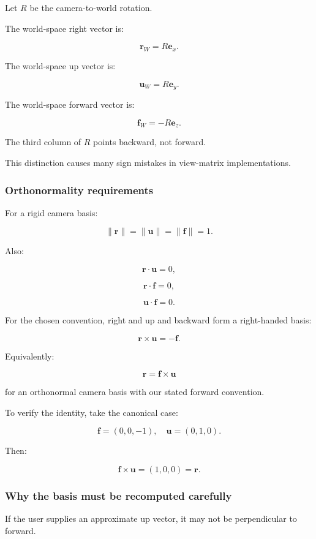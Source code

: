 Let \(R\) be the camera-to-world rotation.

The world-space right vector is:

\[
 \boxed{ \mathbf r_W=R\mathbf e_x }.
\]

The world-space up vector is:

\[
 \boxed{ \mathbf u_W=R\mathbf e_y }.
\]

The world-space forward vector is:

\[
 \boxed{ \mathbf f_W=-R\mathbf e_z }.
\]

The third column of \(R\) points backward, not forward.

This distinction causes many sign mistakes in view-matrix implementations.

\subsubsection{Orthonormality requirements}\label{orthonormality-requirements}

For a rigid camera basis:

\[
 \|\mathbf r\|=\|\mathbf u\|=\|\mathbf f\|=1.
\]

Also:

\[
 \mathbf r\cdot\mathbf u=0,
\]

\[
 \mathbf r\cdot\mathbf f=0,
\]

\[
 \mathbf u\cdot\mathbf f=0.
\]

For the chosen convention, right and up and backward form a right-handed basis:

\[
 \mathbf r\times\mathbf u=-\mathbf f.
\]

Equivalently:

\[
 \mathbf r=\mathbf f\times\mathbf u
\]

for an orthonormal camera basis with our stated forward convention.

To verify the identity, take the canonical case:

\[
 \mathbf f=(0,0,-1),\quad \mathbf u=(0,1,0).
\]

Then:

\[
 \mathbf f\times\mathbf u=(1,0,0)=\mathbf r.
\]

\subsubsection{Why the basis must be recomputed carefully}\label{why-the-basis-must-be-recomputed-carefully}

If the user supplies an approximate up vector, it may not be perpendicular to forward.

